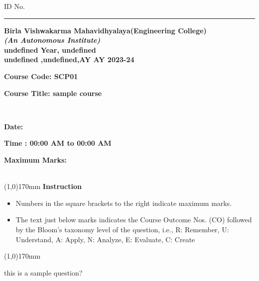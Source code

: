 \documentclass[addpoints,12pt]{exam}
\begin{document}
      \hspace{-7mm}ID No.\rule{20mm}{0.3mm}
      \begin{center}
   \textbf{Birla Vishwakarma Mahavidhyalaya(Engineering College)} \\
    \textbf{\textit{(An Autonomous Institute)}} \\
    \textbf{undefined Year, undefined} \\
    \textbf{undefined ,undefined,AY AY 2023-24} \\
    \vspace{4mm}
   
   
    \end{center}
   
    \hspace{-7mm}
    \parbox[t]{50mm}{\textbf{Course Code: SCP01}}
    \parbox[t]{100mm}{\textbf{Course Title: sample course}}\vspace{2mm}\\
    \parbox[t]{50mm}{\textbf{Date: }}
    \parbox[t]{75mm}{\textbf{Time : 00:00 AM to 00:00 AM}}
    \parbox[t]{50mm}{\textbf{Maximum Marks: }}\\
    \line(1,0){170mm} \vspace{2mm}
    \hspace{-6mm}\textbf{Instruction}
  
   
  
    \begin{itemize}[leftmargin=4mm,rightmargin=-2cm]
        \item Numbers in the square brackets to the right indicate maximum marks.
       
        \item The text just below marks indicates the Course Outcome Nos. (CO) followed by the Bloom’s taxonomy level of the question, i.e., R: Remember, U: Understand, A: Apply, N: Analyze, E: Evaluate, C: Create
    \end{itemize}
    \line(1,0){170mm}
   \vspace{5mm}
\begin{questions}
\pointname{}
\pointsinrightmargin
{}\question[1] t\vspace{-\baselineskip}\vspace{1mm}his is a sample question?
 \vspace{2mm} 

 \end{questions}
\end{document}
